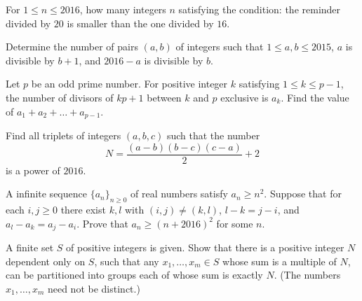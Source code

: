 \documentclass[problems.tex]{subfile}
\begin{document}
	\begin{problem}
		For $1\leq n\leq 2016$, how many integers $n$ satisfying the condition: the reminder divided by $20$ is smaller than the one divided by $16$. %
	\end{problem}

	\begin{problem}
		Determine the number of pairs $(a, b)$ of integers such that $1 \leq a, b \leq 2015$, $a$ is divisible by $b + 1$, and $2016 - a$ is divisible by $b$.%
	\end{problem}

	\begin{problem}
		Let $p$ be an odd prime number. For positive integer $k$ satisfying $1\le k\le p-1$, the number of divisors of $kp+1$ between $k$ and $p$ exclusive is $a_k$. Find the value of $a_1+a_2+\ldots + a_{p-1}$. %
	\end{problem}

	\begin{problem}
		Find all triplets of integers $(a,b,c)$ such that the number
		$$N = \frac{(a-b)(b-c)(c-a)}{2} + 2$$is a power of $2016$. %
	\end{problem}

	\begin{problem}
		A infinite sequence $\{ a_n \}_{n \ge 0}$ of real numbers satisfy $a_n \ge n^2$. Suppose that for each $i, j \ge 0$ there exist $k, l$ with $(i,j) \neq (k,l)$, $l - k = j - i$, and $a_l - a_k = a_j - a_i$. Prove that $a_n \ge (n + 2016)^2$ for some $n$. %
	\end{problem}

	\begin{problem}
		A finite set $S$ of positive integers is given. Show that there is a positive integer $N$ dependent only on $S$, such that any $x_1, \dots, x_m \in S$ whose sum is a multiple of $N$, can be partitioned into groups each of whose sum is exactly $N$. (The numbers $x_1, \dots, x_m$ need not be distinct.) %
	\end{problem}
\end{document}
